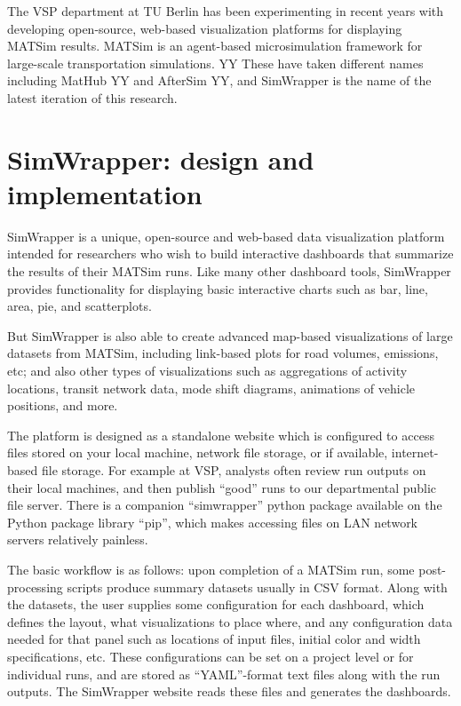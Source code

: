 \documentclass[3p,times,procedia]{elsarticle}
\begin{document}
The VSP department at TU Berlin has been experimenting in recent years with developing open-source, web-based visualization platforms for displaying MATSim results. MATSim is an agent-based microsimulation framework for large-scale transportation simulations. YY These have taken different names including MatHub YY and AfterSim YY, and SimWrapper is the name of the latest iteration of this research.


\section{SimWrapper: design and implementation}

SimWrapper is a unique, open-source and web-based data visualization platform intended for researchers who wish to build interactive dashboards that summarize the results of their MATSim runs. Like many other dashboard tools, SimWrapper provides functionality for displaying basic interactive charts such as bar, line, area, pie, and scatterplots.

But SimWrapper is also able to create advanced map-based visualizations of large datasets from MATSim, including link-based plots for road volumes, emissions, etc; and also other types of visualizations such as aggregations of activity locations, transit network data,
mode shift diagrams, animations of vehicle positions, and more.

The platform is designed as a standalone website which is configured to access files stored on your local machine, network file storage, or if available, internet-based file storage. For example at VSP, analysts often review run outputs on their local machines, and then publish “good” runs to our departmental public file server. There is a companion “simwrapper” python package available on the Python package library “pip”, which makes accessing files on
LAN network servers relatively painless.

The basic workflow is as follows: upon completion of a MATSim run, some post-processing scripts produce summary datasets usually in CSV format. Along with the datasets, the user supplies some configuration for each dashboard, which defines the layout, what visualizations to place where, and any configuration data needed for that panel such as locations of input files, initial color and width specifications, etc. These configurations can be set on a project level or for individual runs, and are stored as “YAML”-format text files along with the run outputs. The SimWrapper website reads these files and generates the dashboards.
\end{document}
